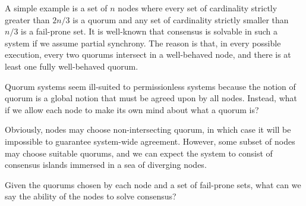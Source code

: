 \documentclass[11pt]{article}
\begin{document}
A simple example is a set of $n$ nodes where every set of cardinality strictly
greater than $2n/3$ is a quorum and any set of cardinality strictly smaller
than $n/3$ is a fail-prone set. It is well-known that consensus is solvable in
such a system if we assume partial synchrony. The reason is that, in every
possible execution, every two quorums intersect in a well-behaved node, and
there is at least one fully well-behaved quorum.

Quorum systems seem ill-suited to permissionless systems because the notion of
quorum is a global notion that must be agreed upon by all nodes. Instead, what
if we allow each node to make its own mind about what a quorum is?


Obviously, nodes may choose non-intersecting quorum, in which case it will be
impossible to guarantee system-wide agreement. However, some subset of nodes
may choose suitable quorums, and we can expect the system to consist of
consensus islands immersed in a sea of diverging nodes.

Given the quorums chosen by each node and a set of fail-prone sets, what can we
say the ability of the nodes to solve consensus?



\end{document}
